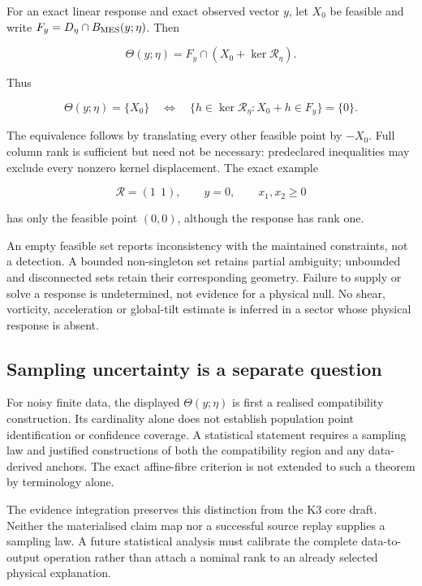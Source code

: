 \documentclass[
  11pt,
  a4paper]{article}
\begin{document}
For an exact linear response and exact observed vector \(y\), let \(X_0\) be feasible and write \(F_y=D_\eta\cap B_{\rm MES}(y;\eta)\). Then

\[
\Theta(y;\eta)=F_y\cap(X_0+\ker\mathcal R_\eta).
\]

Thus

\[
\boxed{
\Theta(y;\eta)=\{X_0\}
\quad\Longleftrightarrow\quad
\{h\in\ker\mathcal R_\eta:X_0+h\in F_y\}=\{0\}.
}
\]

The equivalence follows by translating every other feasible point by \(-X_0\). Full column rank is sufficient but need not be necessary: predeclared inequalities may exclude every nonzero kernel displacement. The exact example

\[
\mathcal R=(1\ \ 1),\qquad y=0,\qquad x_1,x_2\ge0
\]

has only the feasible point \((0,0)\), although the response has rank one.

An empty feasible set reports inconsistency with the maintained constraints, not a detection. A bounded non-singleton set retains partial ambiguity; unbounded and disconnected sets retain their corresponding geometry. Failure to supply or solve a response is undetermined, not evidence for a physical null. No shear, vorticity, acceleration or global-tilt estimate is inferred in a sector whose physical response is absent.

\hypertarget{sampling-uncertainty-is-a-separate-question}{%
\subsection{Sampling uncertainty is a separate question}\label{sampling-uncertainty-is-a-separate-question}}

For noisy finite data, the displayed \(\Theta(y;\eta)\) is first a realised compatibility construction. Its cardinality alone does not establish population point identification or confidence coverage. A statistical statement requires a sampling law and justified constructions of both the compatibility region and any data-derived anchors. The exact affine-fibre criterion is not extended to such a theorem by terminology alone.

The evidence integration preserves this distinction from the K3 core draft. Neither the materialised claim map nor a successful source replay supplies a sampling law. A future statistical analysis must calibrate the complete data-to-output operation rather than attach a nominal rank to an already selected physical explanation.
\end{document}
